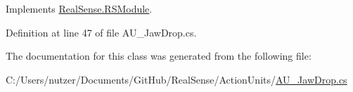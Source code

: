 Implements \hyperlink{class_real_sense_1_1_r_s_module_a2ec830b7932ee7c0077d473f81c73867}{Real\+Sense.\+R\+S\+Module}.



Definition at line 47 of file A\+U\+\_\+\+Jaw\+Drop.\+cs.



The documentation for this class was generated from the following file\+:\begin{DoxyCompactItemize}
\item 
C\+:/\+Users/nutzer/\+Documents/\+Git\+Hub/\+Real\+Sense/\+Action\+Units/\hyperlink{_a_u___jaw_drop_8cs}{A\+U\+\_\+\+Jaw\+Drop.\+cs}\end{DoxyCompactItemize}
